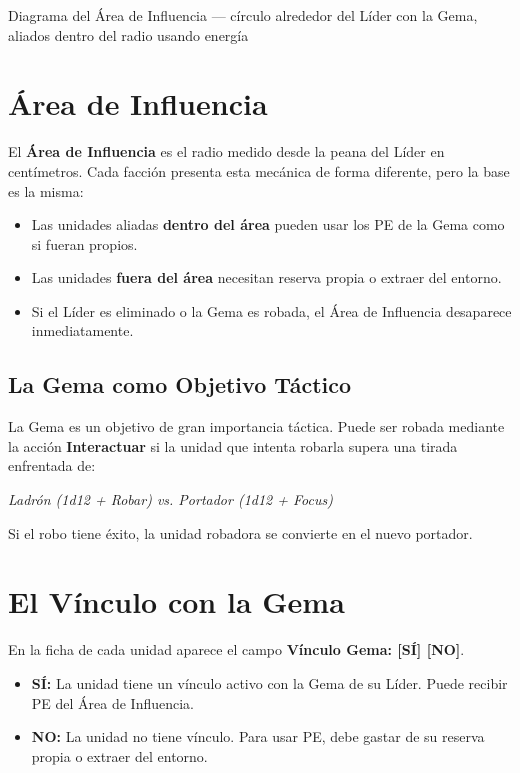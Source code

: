 \begin{imagebox}{Diagrama del Área de Influencia — círculo alrededor del Líder con la Gema, aliados dentro del radio usando energía}
    \vspace{3cm}
\end{imagebox}

\section{Área de Influencia}

El \textbf{Área de Influencia} es el radio medido desde la peana del Líder en centímetros. Cada facción presenta esta mecánica de forma diferente, pero la base es la misma:

\begin{itemize}
    \item Las unidades aliadas \textbf{dentro del área} pueden usar los PE de la Gema como si fueran propios.
    \item Las unidades \textbf{fuera del área} necesitan reserva propia o extraer del entorno.
    \item Si el Líder es eliminado o la Gema es robada, el Área de Influencia desaparece inmediatamente.
\end{itemize}

\subsection*{La Gema como Objetivo Táctico}

La Gema es un objetivo de gran importancia táctica. Puede ser robada mediante la acción \textbf{Interactuar} si la unidad que intenta robarla supera una tirada enfrentada de:

\begin{center}
\textit{Ladrón (1d12 + Robar) vs. Portador (1d12 + Focus)}
\end{center}

Si el robo tiene éxito, la unidad robadora se convierte en el nuevo portador.

\section{El Vínculo con la Gema}

En la ficha de cada unidad aparece el campo \textbf{Vínculo Gema: [SÍ] [NO]}.

\begin{itemize}
    \item \textbf{SÍ:} La unidad tiene un vínculo activo con la Gema de su Líder. Puede recibir PE del Área de Influencia.
    \item \textbf{NO:} La unidad no tiene vínculo. Para usar PE, debe gastar de su reserva propia o extraer del entorno.
\end{itemize}

